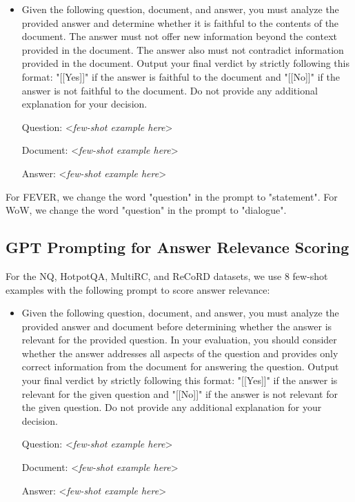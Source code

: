 \begin{itemize}
    \item Given the following question, document, and answer, you must analyze the provided answer and determine whether it is faithful to the contents of the document. The answer must not offer new information beyond the context provided in the document. The answer also must not contradict information provided in the document. Output your final verdict by strictly following this format: "[[Yes]]" if the answer is faithful to the document and "[[No]]" if the answer is not faithful to the document. Do not provide any additional explanation for your decision.

    Question: <\textit{few-shot example here}>
    
    Document: <\textit{few-shot example here}>

    Answer: <\textit{few-shot example here}>

    
\end{itemize}

For FEVER, we change the word "question" in the prompt to "statement". 
For WoW, we change the word "question" in the prompt to "dialogue".

\subsection{GPT Prompting for Answer Relevance Scoring}
\label{sec:gpt_prompting_for_answer_relevance_scoring}

For the NQ, HotpotQA, MultiRC, and ReCoRD datasets, we use 8 few-shot examples with the following prompt to score answer relevance:

\begin{itemize}
    \item Given the following question, document, and answer, you must analyze the provided answer and document before determining whether the answer is relevant for the provided question. In your evaluation, you should consider whether the answer addresses all aspects of the question and provides only correct information from the document for answering the question. Output your final verdict by strictly following this format: "[[Yes]]" if the answer is relevant for the given question and "[[No]]" if the answer is not relevant for the given question. Do not provide any additional explanation for your decision.

    Question: <\textit{few-shot example here}>
    
    Document: <\textit{few-shot example here}>

    Answer: <\textit{few-shot example here}>
\end{itemize}

